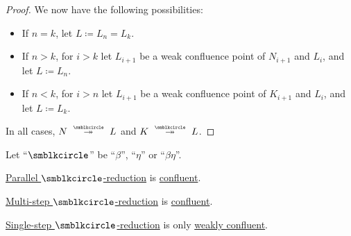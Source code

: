 \begin{proof}
  We now have the following possibilities:
  \begin{itemize}
    \item If \( n = k \), let \( L \coloneqq L_n = L_k \).
    \item If \( n > k \), for \( i > k \) let \( L_{i+1} \) be a weak confluence point of \( N_{i+1} \) and \( L_i \), and let \( L \coloneqq L_n \).
    \item If \( n < k \), for \( i > n \) let \( L_{i+1} \) be a weak confluence point of \( K_{i+1} \) and \( L_i \), and let \( L \coloneqq L_k \).
  \end{itemize}

  In all cases, \( N \pred* L \) and \( K \pred* L \).
\end{proof}

\begin{theorem}\label{thm:church_rosser_theorem}
  Let \enquote{\( {\anon} \)} be \enquote{\( \beta \)}, \enquote{\( \eta \)} or \enquote{\( \beta\eta \)}.

  \begin{thmenum}
     \hyperref[def:parallel_reduction]{Parallel \( \anon \)-reduction} is \hyperref[def:reduction_confluence]{confluent}.

     \hyperref[def:lambda_reduction/multi]{Multi-step \( \anon \)-reduction} is \hyperref[def:reduction_confluence]{confluent}.

     \hyperref[def:lambda_reduction/single]{Single-step \( \anon \)-reduction} is only \hyperref[def:reduction_confluence]{weakly confluent}.
  \end{thmenum}
\end{theorem}
